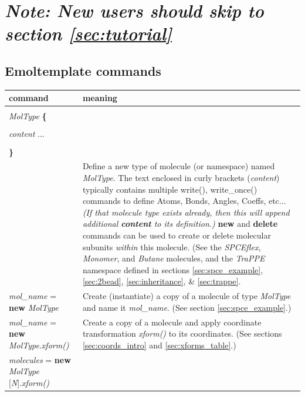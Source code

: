 \documentclass[11pt]{article}
\begin{document}
\section*{
\textit{Note: New users should skip to section \ref{sec:tutorial}}
}



\subsection{Emoltemplate commands}

\begin{longtable}[h]{l|p{9cm}}
\textbf{command} & \textbf{meaning}
\\
\hline
\hline
\begin{tabular}[t]{l}
\\
\textit{MolType} \textbf{\{} \\
\\
\hspace{0.35cm} \textit{content} ... \\
\\
\textbf{\}} \\
\end{tabular}
& 
Define a new type of molecule (or namespace) named \textit{MolType}.
The text enclosed in curly brackets (\textit{content})
typically contains multiple write(), write\_once()
commands to define Atoms, Bonds, Angles, Coeffs, etc...
\textit{(If that molecule type exists already, 
then this will append additional \textbf{content} to its definition.)}
\textbf{new} and \textbf{delete} commands can be used 
to create or delete molecular subunits \textit{within} this molecule.
(See the \textit{SPCEflex}, \textit{Monomer}, and \textit{Butane} 
 molecules, and the \textit{TraPPE} namespace 
 defined in sections \ref{sec:spce_example}, \ref{sec:2bead},
 \ref{sec:inheritance}, \& \ref{sec:trappe}.
\\
\hline
\textit{mol\_name} = \textbf{new} \textit{MolType} &
Create (instantiate) a copy of a molecule of type \textit{MolType}
and name it \textit{mol\_name}.
(See section \ref{sec:spce_example}.)
\\
\hline
\textit{mol\_name} = \textbf{new} \textit{MolType}.\textit{xform()} &
Create a copy of a molecule and
apply coordinate transformation \textit{xform()} to its coordinates.
(See sections \ref{sec:coords_intro} and \ref{sec:xforms_table}.)
\\
\hline
\textit{molecules} = 
  \textbf{new} \textit{MolType} [\textit{N}].\textit{xform()}&

\end{longtable}
\end{document}
